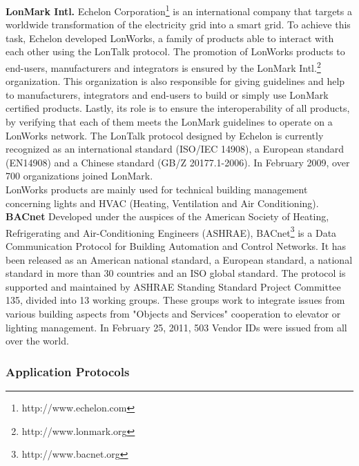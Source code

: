 {\bf LonMark Intl.} Echelon Corporation\footnote{http://www.echelon.com} is an international company that targets a worldwide transformation of the electricity grid into a smart grid. To achieve this task, Echelon developed LonWorks, a family of products able to interact with each other using the LonTalk protocol. The promotion of LonWorks products to end-users, manufacturers and integrators is ensured by the LonMark Intl.\footnote{http://www.lonmark.org} organization. This organization is also responsible for giving guidelines and help to manufacturers, integrators and end-users to build or simply use LonMark certified products. Lastly, its role is to ensure the interoperability of all products, by verifying that each of them meets the LonMark guidelines to operate on a LonWorks network. The LonTalk protocol designed by Echelon is currently recognized as an international standard (ISO/IEC 14908), a European standard (EN14908) and a Chinese standard (GB/Z 20177.1-2006). In February 2009, over 700 organizations joined LonMark.\\
LonWorks products are mainly used for technical building management concerning lights and HVAC (Heating, Ventilation and Air Conditioning).\\

{\bf BACnet} Developed under the auspices of the American Society of Heating, Refrigerating and Air-Conditioning Engineers (ASHRAE), BACnet\footnote{http://www.bacnet.org} is a Data Communication Protocol for Building Automation and Control Networks. It has been released as an American national standard, a European standard, a national standard in more than 30 countries and an ISO global standard. The protocol is supported and maintained by ASHRAE Standing Standard Project Committee 135, divided into 13 working groups. These groups work to integrate issues from various building aspects from "Objects and Services" cooperation to elevator or lighting management. In February 25, 2011, 503 Vendor IDs were issued from all over the world.\\

\subsubsection{Application Protocols}

